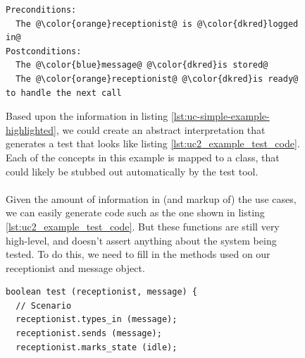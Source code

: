 \begin{figure}[!htbp]
\begin{lstlisting}[frame=single,style=usecase, caption=Use case example with its different parts highlighted, label=lst:uc-simple-example-highlighted]
Preconditions:
  The @\color{orange}receptionist@ is @\color{dkred}logged in@
Postconditions:
  The @\color{blue}message@ @\color{dkred}is stored@
  The @\color{orange}receptionist@ @\color{dkred}is ready@ to handle the next call
\end{lstlisting} 
Based upon the information in listing \ref{lst:uc-simple-example-highlighted}, we could create an abstract interpretation that generates a test that looks like listing \ref{lst:uc2_example_test_code}.
Each of the concepts in this example is mapped to a class, that could likely be stubbed out automatically by the test tool.\\\\
Given the amount of information in (and markup of) the use cases, we can easily generate code such as the one shown in listing \ref{lst:uc2_example_test_code}. But these functions are still very high-level, and doesn't assert anything about the system being tested. To do this, we need to fill in the methods used on our receptionist and message object.
\begin{lstlisting}[caption=Suggestion of generated test case,label={lst:uc2_example_test_code}]
boolean test (receptionist, message) {
  // Scenario
  receptionist.types_in (message);
  receptionist.sends (message);
  receptionist.marks_state (idle);
  

\end{lstlisting}
\end{figure}
